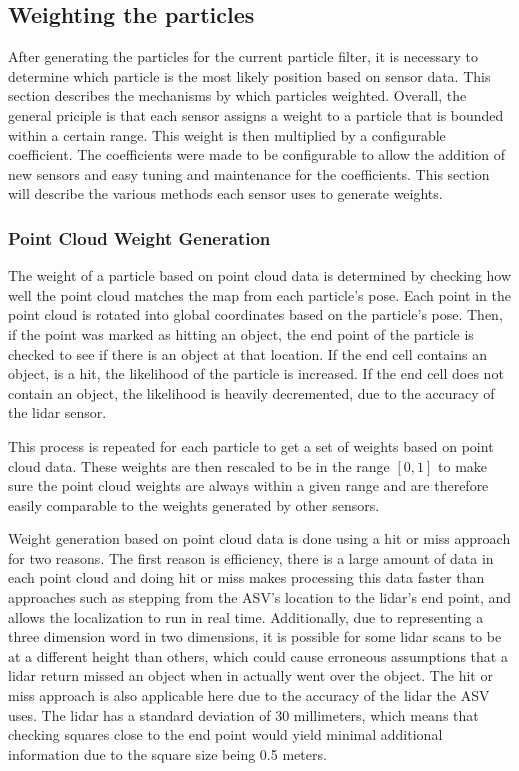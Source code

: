 \documentclass[10pt]{IEEEtran}
\begin{document}
\subsection{Weighting the particles}
After generating the particles for the current particle filter, it is necessary to determine
which particle is the most likely position based on sensor data.  This section describes 
the mechanisms by which particles weighted. Overall, the general priciple is that each sensor
assigns a weight to a particle that is bounded within a certain range.  This weight is then
multiplied by a configurable coefficient.  The coefficients were made to be configurable 
to allow the addition of new sensors and easy tuning and maintenance for the coefficients.
This section will describe the various methods each sensor uses to generate weights.

\subsubsection{Point Cloud Weight Generation}
The weight of a particle based on point cloud data is determined by checking how well the
point cloud matches the map from each particle's pose.  Each point in the point cloud is 
rotated into global coordinates based on the particle's pose.  Then, if the point was marked
as hitting an object, the end point of the
particle is checked to see if there is an object at that location.  If the end cell 
contains an object, is a hit, the likelihood of the particle is increased.  If the end
cell does not contain an object, the likelihood is heavily decremented, due to the accuracy
of the lidar sensor.

This process is repeated for each particle to get a set of weights based on point cloud data.
These weights are then rescaled to be in the range \([0,1]\) to make sure the point cloud
weights are always within a given range and are therefore easily comparable to the weights 
generated by other sensors.

Weight generation based on point cloud data is done using a hit or miss approach for two
reasons.  The first reason is efficiency, there is a large amount of data in each point cloud
and doing hit or miss makes processing this data faster than approaches such as stepping
from the ASV's location to the lidar's end point, and allows the localization to run in real
time. Additionally, due to representing a three dimension word in two dimensions, it is 
possible for some lidar scans to be at a different height than others, which could cause
erroneous assumptions that a lidar return missed an object when in actually went over
the object.  The hit or miss approach is also applicable here due to the accuracy
of the lidar the 
ASV uses.  The lidar has a standard deviation of 30 millimeters, which means that checking
squares close to the end point would yield minimal additional information due to the square
size being 0.5 meters.
\end{document}
